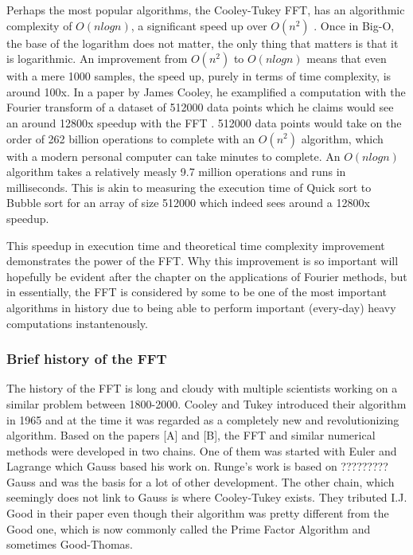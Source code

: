 Perhaps the most popular algorithms, the Cooley-Tukey FFT, has an algorithmic complexity of $O(n log n)$, a significant speed up over $O(n^2)$ \cite{Randhawa2018} \cite{HeidemanEtAl1984}. Once in Big-O, the base of the logarithm does not matter, the only thing that matters is that it is logarithmic. An improvement from $O(n^2)$ to $O(nlogn)$ means that even with a mere 1000 samples, the speed up, purely in terms of time complexity, is around 100x. In a paper by James Cooley, he examplified a computation with the Fourier transform of a dataset of 512000 data points which he claims would see an around 12800x speedup with the FFT \cite{Cooley1987}. 512000 data points would take on the order of 262 billion operations to complete with an $O(n^2)$ algorithm, which with a modern personal computer can take minutes to complete. An $O(n log n)$ algorithm takes a relatively measly 9.7 million operations and runs in milliseconds. This is akin to measuring the execution time of Quick sort to Bubble sort for an array of size 512000 which indeed sees around a 12800x speedup.

This speedup in execution time and theoretical time complexity improvement demonstrates the power of the FFT. Why this improvement is so important will hopefully be evident after the chapter on the applications of Fourier methods, but in essentially, the FFT is considered by some  to be one of the most important algorithms in history due to being able to perform important (every-day) heavy computations instantenously. 

\subsubsection{Brief history of the FFT}
The history of the FFT is long and cloudy with multiple scientists working on a similar problem between 1800-2000. Cooley and Tukey introduced their algorithm in 1965 and at the time it was regarded as a completely new and revolutionizing algorithm. Based on the papers [A] and [B], the FFT and similar numerical methods were developed in two chains. One of them was started with Euler and Lagrange which Gauss based his work on. Runge's work is based on ????????? Gauss and was the basis for a lot of other development. The other chain, which seemingly does not link to Gauss is where Cooley-Tukey exists. They tributed I.J. Good in their paper even though their algorithm was pretty different from the Good one, which is now commonly called the Prime Factor Algorithm and sometimes Good-Thomas. 

